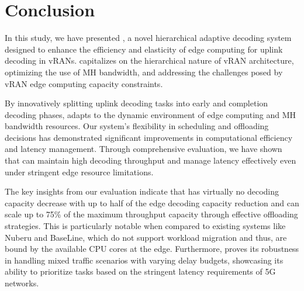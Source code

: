 \section{Conclusion}

In this study, we have presented \Name{}, a novel hierarchical adaptive decoding system designed to enhance the efficiency and elasticity of edge computing for uplink decoding in vRANs. \Name{} capitalizes on the hierarchical nature of vRAN architecture, optimizing the use of MH bandwidth, and addressing the challenges posed by vRAN edge computing capacity constraints.

By innovatively splitting uplink decoding tasks into early and completion decoding phases, \Name{} adapts to the dynamic environment of edge computing and MH bandwidth resources. Our system’s flexibility in scheduling and offloading decisions has demonstrated significant improvements in computational efficiency and latency management. Through comprehensive evaluation, we have shown that \Name{} can maintain high decoding throughput and manage latency effectively even under stringent edge resource limitations.


The key insights from our evaluation indicate that \Name{} has virtually no decoding capacity decrease
with up to half of the edge decoding capacity reduction and \Name{} can scale up to 75\% of the maximum throughput capacity through effective offloading strategies. This is particularly notable when compared to existing systems like Nuberu and BaseLine, which do not support workload migration and thus, are bound by the available CPU cores at the edge. Furthermore, \Name{} proves its robustness in handling mixed traffic scenarios with varying delay budgets, showcasing its ability to prioritize tasks based on the stringent latency requirements of 5G networks.


